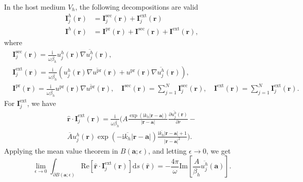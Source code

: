 \documentclass{article}
\begin{document}
In the host medium $V_h$, the following decompositions are valid
%
\begin{align}
\label{host_decomp_single}
\mathbf{I}_j^h(\mathbf{r})&=\mathbf{I}_j^{\mathrm{sec}}(\mathbf{r})+\mathbf{I}_j^{\mathrm{ext}}(\mathbf{r})\\
\label{host_decomp_overall}
\mathbf{I}^h(\mathbf{r})&=\mathbf{I}^{\mathrm{pr}}(\mathbf{r})+\mathbf{I}^{\mathrm{sec}}(\mathbf{r})+\mathbf{I}^{\mathrm{ext}}(\mathbf{r}),
\end{align}
%
where
%
\begin{align*}
&\mathbf{I}_j^{\mathrm{sec}}(\mathbf{r})=\frac{\mathrm{i}}{\omega\overline{\beta_h}}u_j^{h}(\mathbf{r})\nabla\overline{u_j^{h}}(\mathbf{r}), \\&\mathbf{I}_j^{\mathrm{ext}}(\mathbf{r})=\frac{\mathrm{i}}{\omega\overline{\beta_h}}\left(u_j^{h}(\mathbf{r})\nabla\overline{u^{\mathrm{pr}}}(\mathbf{r})+u^{\mathrm{pr}}(\mathbf{r})\nabla\overline{u_j^{h}}(\mathbf{r})\right),\\
&\mathbf{I}^{\mathrm{pr}}(\mathbf{r})=\frac{\mathrm{i}}{\omega\overline{\beta_h}}u^{\mathrm{pr}}(\mathbf{r})\nabla\overline{u^{\mathrm{pr}}}(\mathbf{r}), \quad \mathbf{I}^{\mathrm{sec}}(\mathbf{r})=\sum_{j=1}^{N}\mathbf{I}_j^{\mathrm{sec}}(\mathbf{r}), \quad \mathbf{I}^{\mathrm{ext}}(\mathbf{r})=\sum_{j=1}^{N}\mathbf{I}_j^{\mathrm{ext}}(\mathbf{r}).
\end{align*}
%
For $\mathbf{I}_j^{\mathrm{ext}}$, we have
%
\begin{align}
\nonumber
\hat{\mathbf{r}}\cdot\mathbf{I}_j^{\mathrm{ext}}(\mathbf{r})=\frac{\mathrm{i}}{\omega\overline{\beta_h}}\Bigg(A\frac{\exp{(\mathrm{i}k_h\lvert\mathbf{r}-\mathbf{a}\rvert)}}{\lvert\mathbf{r}-\mathbf{a}\rvert}\frac{\partial \overline{u_j^{h}}(\mathbf{r})}{\partial r}-\\\overline{A}u_j^{h}(\mathbf{r})\exp{(-\mathrm{i}\overline{k_h}\lvert\mathbf{r}-\mathbf{a}\rvert)}\frac{\mathrm{i}\overline{k_h}\lvert\mathbf{r}-\mathbf{a}\rvert+1}{\lvert\mathbf{r}-\mathbf{a}\rvert^2}\Bigg).
\label{Theorem6_4}
\end{align}
%
Applying the mean value theorem in $B(\mathbf{a};\epsilon)$, and letting $\epsilon\rightarrow0$, we get
\begin{equation}
    \label{Theorem6_5}
    \lim_{\epsilon\rightarrow0}\int_{\partial B(\mathbf{a};\epsilon)}\mathrm{Re}\left[\hat{\mathbf{r}}\cdot\mathbf{I}_j^{\mathrm{ext}}(\mathbf{r})\right]\mathrm{d}s(\hat{\mathbf{r}})=-\frac{4\pi}{\omega}\mathrm{Im}\left[\frac{A}{\beta_h}\overline{u_j^{h}}(\mathbf{a})\right].
\end{equation}
\end{document}
